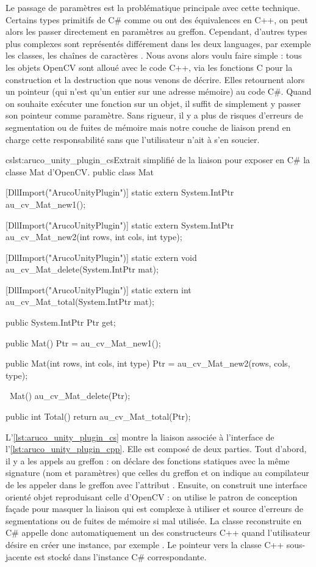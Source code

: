 Le passage de paramètres est la problématique principale avec cette technique. Certains types primitifs de C\# comme  ou  ont des équivalences en C++, on peut alors les passer directement en paramètres au greffon. Cependant, d'autres types plus complexes sont représentés différement dans les deux languages, par exemple les classes, les chaînes de caractères \cite{Peterson2015}. Nous avons alors voulu faire simple : tous les objets OpenCV sont alloué avec le code C++, via les fonctions C pour la construction et la destruction que nous venons de décrire. Elles retournent alors un pointeur (qui n'est qu'un entier sur une adresse mémoire) au code C\#. Quand on souhaite exécuter une fonction sur un objet, il suffit de simplement y passer son pointeur comme paramètre. Sans rigueur, il y a plus de risques d'erreurs de segmentation ou de fuites de mémoire mais notre couche de liaison prend en charge cette responsabilité sans que l'utilisateur n'ait à s'en soucier.

\begin{listingETS}{cs}{lst:aruco_unity_plugin_cs}{Extrait simplifié de la liaison pour exposer en C\# la classe Mat d'OpenCV.}
  public class Mat
  {
    [DllImport("ArucoUnityPlugin")]
    static extern System.IntPtr au_cv_Mat_new1();

    [DllImport("ArucoUnityPlugin")]
    static extern System.IntPtr au_cv_Mat_new2(int rows, int cols, int type);

    [DllImport("ArucoUnityPlugin")]
    static extern void au_cv_Mat_delete(System.IntPtr mat);
    
    [DllImport("ArucoUnityPlugin")]
    static extern int au_cv_Mat_total(System.IntPtr mat);

    public System.IntPtr Ptr { get; }

    public Mat()
    {
      Ptr = au_cv_Mat_new1();
    }

    public Mat(int rows, int cols, int type)
    {
      Ptr = au_cv_Mat_new2(rows, cols, type);
    }

    ~Mat()
    {
      au_cv_Mat_delete(Ptr);
    }

    public int Total()
    {
      return au_cv_Mat_total(Ptr);
    }
  }
\end{listingETS}

L'\autoref{lst:aruco_unity_plugin_cs} montre la liaison associée à l'interface de l'\autoref{lst:aruco_unity_plugin_cpp}. Elle est composé de deux parties. Tout d'abord, il y a les appels au greffon : on déclare des fonctions statiques avec la même signature (nom et paramètres) que celles du greffon et on indique au compilateur de les appeler dans le greffon avec l'attribut . Ensuite, on construit une interface orienté objet reproduisant celle d'OpenCV : on utilise le patron de conception façade pour masquer la liaison qui est complexe à utiliser et source d'erreurs de segmentations ou de fuites de mémoire si mal utilisée. La classe  reconstruite en C\# appelle donc automatiquement un des constructeurs C++ quand l'utilisateur désire en créer une instance, par exemple . Le pointeur vers la classe C++ sous-jacente est stocké dans l'instance C\# correspondante.

